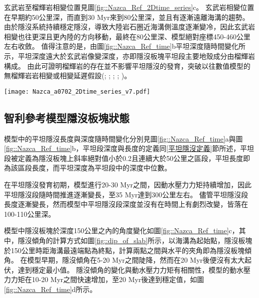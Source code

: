 玄武岩至榴輝岩相變位置見圖\ref{fig::Nazca_Ref_2Dtime_series}c。
玄武岩相變位置在早期約50公里深，而直到30 Myr來到80公里深，並且有逐漸遠離海溝的趨勢。
由於隱沒系統持續穩定隱沒，導致大陸岩石圈近海溝側溫度逐漸變冷，因此玄武岩相變也往更深且更內陸的方向移動，最終在80公里深、模型絕對座標450-460公里左右收斂。
值得注意的是，由圖\ref{fig::Nazca_Ref_time}b平坦深度隨時間變化所示，平坦深度遠大於玄武岩像變深度，亦即隱沒板塊平坦段主要地殼成分由榴輝岩構成。
由此可證明榴輝岩的存在並不影響平坦隱沒的發育，突破以往數值模型的無榴輝岩岩相變或相變延遲假設(\citealp{van2002role}; \citealp{Liu2016}; \citealp{Hu2016}; \citealp{van2002role}; \citealp{Gerya2009})。
\begin{figure*}[ht!]
    \centering
    \texttt{[image: Nazca\_a0702\_2Dtime\_series\_v7.pdf]}
    \caption[智利參考模型部分熔融、岩漿庫與玄武岩相變時空關係圖]{智利參考模型部分熔融、岩漿庫與玄武岩相變位置時空關係圖。(a)圓點為智利參考模型於時間軸上部分熔融發生網格位置，圓點顏色代表時間，僅包含網格中熔融比例大於千分之一的網格。線條為每10 Myr的隱沒板塊頂部介面，分別為10 Myr、20 Myr、30 Myr與40 Myr，橫軸上方標示出模型於40 Myr的相對海溝距離。(b)圓點為智利參考模型於時間軸上岩漿庫網格位置，圓點顏色代表時間，僅繪出網格中岩漿比例大於萬分之一的網格。線條為每10 Myr的隱沒板塊頂部介面，分別為10 Myr、20 Myr、30 Myr與40 Myr，橫軸上方標示出模型於40 Myr的相對海溝距離。藍細線標示出兩個岩漿庫集中區寬度範圍，並分別在橘色方框中標出文中說明的岩漿庫區名稱。(c)圓點為智利參考模型於時間軸上之玄武岩相變位置變化圖，圓點顏色代表時間。}
    \label{fig::Nazca_Ref_2Dtime_series}
\end{figure*}

\subsection{智利參考模型隱沒板塊狀態}
模型中的平坦隱沒長度與深度隨時間變化分別見圖\ref{fig::Nazca_Ref_time}a與圖\ref{fig::Nazca_Ref_time}b，平坦段深度與長度的定義同\ref{平坦隱沒定義}節所述，平坦段被定義為隱沒板塊上斜率絕對值小於0.2且連續大於50公里之區段，平坦長度即為該區段長度，而平坦深度為平坦段中的深度中位數。

在平坦隱沒發育初期，模型進行20-30 Myr之間，因動水壓力力矩持續增加，因此平坦隱沒段隨時間推進逐漸變長，至35 Myr達到300公里左右。
儘管平坦隱沒段長度逐漸變長，然而模型中平坦隱沒段深度並沒有在時間上有劇烈改變，皆落在100-110公里深。

模型中隱沒板塊於深度150公里之內的角度變化如圖\ref{fig::Nazca_Ref_time}c，其中，隱沒傾角的計算方式如圖\ref{fig::dip_of_slab}所示，以海溝為起始點，隱沒板塊於150公里時距海溝最遠端點為終點，計算兩點之間與水平的夾角即為隱沒板塊傾角。
在模型早期，隱沒傾角在5-20 Myr之間陡降，然而在20 Myr後便沒有太大起伏，達到穩定最小值。
隱沒傾角的變化與動水壓力力矩有相關性，模型的動水壓力力矩在10-20 Myr之間快速增加，至20 Myr後達到穩定值，如圖\ref{fig::Nazca_Ref_time}d所示。


